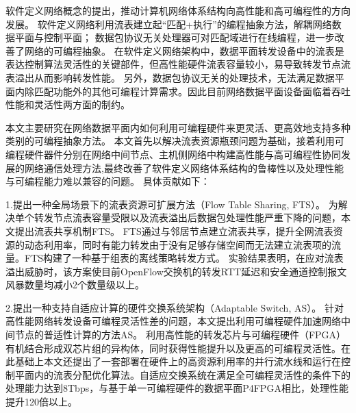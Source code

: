 
\setcounter{page}{1}

%
%
%

软件定义网络概念的提出，推动计算机网络体系结构向高性能和高可编程性的方向发展。
软件定义网络利用流表建立起“匹配+执行”的编程抽象方法，解耦网络数据平面与控制平面；
数据包协议无关处理器可对匹配域进行在线编程，进一步改善了网络的可编程抽象。
在软件定义网络架构中，数据平面转发设备中的流表是表达控制算法灵活性的关键部件，但高性能硬件流表容量较小，易导致转发节点流表溢出从而影响转发性能。
另外，数据包协议无关的处理技术，无法满足数据平面内除匹配功能外的其他可编程计算需求。因此目前网络数据平面设备面临着吞吐性能和灵活性两方面的制约。

本文主要研究在网络数据平面内如何利用可编程硬件来更灵活、更高效地支持多种类别的可编程抽象方法。
本文首先以解决流表资源瓶颈问题为基础，接着利用可编程硬件器件分别在网络中间节点、主机侧网络中构建高性能与高可编程性协同发展的网络通信处理方法,最终改善了软件定义网络体系结构的鲁棒性以及处理性能与可编程能力难以兼容的问题。
具体贡献如下：

1.提出一种全局场景下的流表资源可扩展方法（Flow Table Sharing, FTS）。
为解决单个转发节点流表容量受限以及流表溢出后数据包处理性能严重下降的问题，本文提出流表共享机制FTS。
FTS通过与邻居节点建立流表共享，提升全网流表资源的动态利用率，同时有能力转发由于没有足够存储空间而无法建立流表项的流量。FTS构建了一种基于组表的离线策略转发方式。
实验结果表明，在应对流表溢出威胁时，该方案使目前OpenFlow交换机的转发RTT延迟和安全通道控制报文风暴数量均减小2个数量级以上。

2.提出一种支持自适应计算的硬件交换系统架构（Adaptable Switch, AS）。
针对高性能网络转发设备可编程灵活性差的问题，本文提出利用可编程硬件加速网络中间节点的普适性计算的方法AS。
利用高性能的转发芯片与可编程硬件（FPGA）有机结合形成双芯片组的异构体，同时获得性能提升以及更高的可编程灵活性。在此基础上本文还提出了一套部署在硬件上的高资源利用率的并行流水线和运行在控制平面内的流表分配优化算法。自适应交换系统在满足全可编程灵活性的条件下的处理能力达到8Tbps，与基于单一可编程硬件的数据平面P4FPGA相比，处理性能提升120倍以上。

